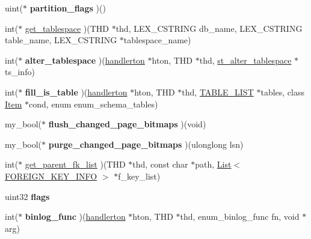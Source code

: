 \begin{DoxyCompactItemize}
uint($\ast$ {\bfseries partition\+\_\+flags} )()
\item 
int($\ast$ \mbox{\hyperlink{structhandlerton_ad5f3570a20fd93e894a5e56404f5472a}{get\+\_\+tablespace}} )(T\+HD $\ast$thd, L\+E\+X\+\_\+\+C\+S\+T\+R\+I\+NG db\+\_\+name, L\+E\+X\+\_\+\+C\+S\+T\+R\+I\+NG table\+\_\+name, L\+E\+X\+\_\+\+C\+S\+T\+R\+I\+NG $\ast$tablespace\+\_\+name)
\item 
\mbox{\label{structhandlerton_a0d7f69e1c9cf0329f9e5d59f421068a7}} 
int($\ast$ {\bfseries alter\+\_\+tablespace} )(\mbox{\hyperlink{structhandlerton}{handlerton}} $\ast$hton, T\+HD $\ast$thd, \mbox{\hyperlink{classst__alter__tablespace}{st\+\_\+alter\+\_\+tablespace}} $\ast$ts\+\_\+info)
\item 
\mbox{\label{structhandlerton_a2c2c125c83d92c072229f2bf84ef9717}} 
int($\ast$ {\bfseries fill\+\_\+is\+\_\+table} )(\mbox{\hyperlink{structhandlerton}{handlerton}} $\ast$hton, T\+HD $\ast$thd, \mbox{\hyperlink{structTABLE__LIST}{T\+A\+B\+L\+E\+\_\+\+L\+I\+ST}} $\ast$tables, class \mbox{\hyperlink{classItem}{Item}} $\ast$cond, enum enum\+\_\+schema\+\_\+tables)
\item 
\mbox{\label{structhandlerton_ab80f4551856021c65e677824e918aea2}} 
my\+\_\+bool($\ast$ {\bfseries flush\+\_\+changed\+\_\+page\+\_\+bitmaps} )(void)
\item 
\mbox{\label{structhandlerton_a77430f88536897473268d51a81dcac48}} 
my\+\_\+bool($\ast$ {\bfseries purge\+\_\+changed\+\_\+page\+\_\+bitmaps} )(ulonglong lsn)
\item 
int($\ast$ \mbox{\hyperlink{structhandlerton_af5efe2d0a29eb581b591e1d12ea09ff4}{get\+\_\+parent\+\_\+fk\+\_\+list}} )(T\+HD $\ast$thd, const char $\ast$path, \mbox{\hyperlink{classList}{List}}$<$ \mbox{\hyperlink{structst__foreign__key__info}{F\+O\+R\+E\+I\+G\+N\+\_\+\+K\+E\+Y\+\_\+\+I\+N\+FO}} $>$ $\ast$f\+\_\+key\+\_\+list)
\item 
\mbox{\label{structhandlerton_aca9d1e2a06f1c38c7804003770f1a051}} 
uint32 {\bfseries flags}
\item 
\mbox{\label{structhandlerton_a7e96136362baa8195f9f42f10e020e40}} 
int($\ast$ {\bfseries binlog\+\_\+func} )(\mbox{\hyperlink{structhandlerton}{handlerton}} $\ast$hton, T\+HD $\ast$thd, enum\+\_\+binlog\+\_\+func fn, void $\ast$arg)

\end{DoxyCompactItemize}
